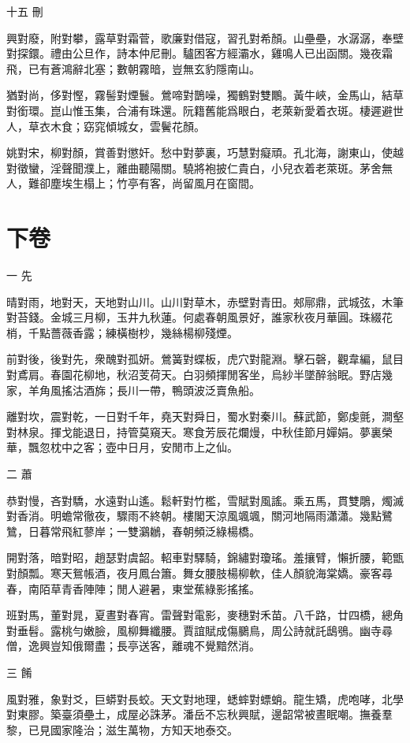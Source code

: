 \documentclass[12pt,a4paper]{ctexbook}
\begin{document}
十五 刪\par
興對廢，附對攀，露草對霜菅，歌廉對借寇，習孔對希顏。山壘壘，水潺潺，奉壁對探鐶。禮由公旦作，詩本仲尼刪。驢困客方經灞水，雞鳴人已出函關。幾夜霜飛，已有蒼鴻辭北塞；數朝霧暗，豈無玄豹隱南山。\par
猶對尚，侈對慳，霧髻對煙鬟。鶯啼對鵲噪，獨鶴對雙鷳。黃牛峽，金馬山，結草對銜環。崑山惟玉集，合浦有珠還。阮籍舊能爲眼白，老萊新愛着衣斑。棲遲避世人，草衣木食；窈窕傾城女，雲鬢花顏。\par
姚對宋，柳對顏，賞善對懲奸。愁中對夢裏，巧慧對癡頑。孔北海，謝東山，使越對徵蠻，淫聲聞濮上，離曲聽陽關。驍將袍披仁貴白，小兒衣着老萊斑。茅舍無人，難卻塵埃生榻上；竹亭有客，尚留風月在窗間。\par

\section{下卷}
一 先\par
晴對雨，地對天，天地對山川。山川對草木，赤壁對青田。郟鄏鼎，武城弦，木筆對苔錢。金城三月柳，玉井九秋蓮。何處春朝風景好，誰家秋夜月華圓。珠綴花梢，千點薔薇香露；練橫樹杪，幾絲楊柳殘煙。\par
前對後，後對先，衆醜對孤妍。鶯簧對蝶板，虎穴對龍淵。擊石磬，觀韋編，鼠目對鳶肩。春園花柳地，秋沼芰荷天。白羽頻揮閒客坐，烏紗半墜醉翁眠。野店幾家，羊角風搖沽酒旆；長川一帶，鴨頭波泛賣魚船。\par
離對坎，震對乾，一日對千年，堯天對舜日，蜀水對秦川。蘇武節，鄭虔氈，澗壑對林泉。揮戈能退日，持管莫窺天。寒食芳辰花爛熳，中秋佳節月嬋娟。夢裏榮華，飄忽枕中之客；壺中日月，安閒市上之仙。\par
二 蕭\par
恭對慢，吝對驕，水遠對山遙。鬆軒對竹檻，雪賦對風謠。乘五馬，貫雙鵰，燭滅對香消。明蟾常徹夜，驟雨不終朝。樓閣天涼風颯颯，關河地隔雨瀟瀟。幾點鷺鷥，日暮常飛紅蓼岸；一雙鸂鶒，春朝頻泛綠楊橋。\par
開對落，暗對昭，趙瑟對虞韶。軺車對驛騎，錦繡對瓊瑤。羞攘臂，懶折腰，範甑對顏瓢。寒天鴛帳酒，夜月鳳台簫。舞女腰肢楊柳軟，佳人顏貌海棠嬌。豪客尋春，南陌草青香陣陣；閒人避暑，東堂蕉綠影搖搖。\par
班對馬，董對晁，夏晝對春宵。雷聲對電影，麥穗對禾苗。八千路，廿四橋，總角對垂髫。露桃勻嫩臉，風柳舞纖腰。賈誼賦成傷鵩鳥，周公詩就託鴟鴞。幽寺尋僧，逸興豈知俄爾盡；長亭送客，離魂不覺黯然消。\par
三 餚\par
風對雅，象對爻，巨蟒對長蛟。天文對地理，蟋蟀對螵蛸。龍生矯，虎咆哮，北學對東膠。築臺須壘土，成屋必誅茅。潘岳不忘秋興賦，邊韶常被晝眠嘲。撫養羣黎，已見國家隆治；滋生萬物，方知天地泰交。\par
\end{document}
